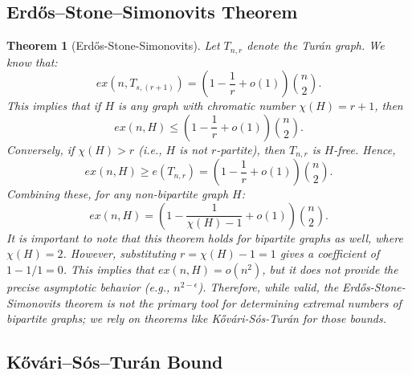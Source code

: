 \documentclass[a4paper]{article}
\newtheorem{thm}{Theorem}[section]
\begin{document}
\subsection{Erdős–Stone–Simonovits Theorem}

\begin{thm}[Erd\H{o}s-Stone-Simonovits]
    Let $T_{n,r}$ denote the Tur\'{a}n graph. We know that:
    \[
    ex(n, T_{s,(r+1)}) = \left (1-\frac{1}{r}+o(1)\right ){n \choose 2}.
    \] 
    This implies that if $H$ is any graph with chromatic number $\chi(H) = r+1$, then
    \[
    ex(n,H) \leq \left( 1-\frac{1}{r}+o(1) \right){n \choose 2}.
    \] 
    Conversely, if $\chi(H) > r$ (i.e., $H$ is not $r$-partite), then $T_{n,r}$ is $H$-free. Hence,
    \[
    ex(n,H) \geq e(T_{n,r}) = \left( 1-\frac{1}{r}+o(1) \right){n \choose 2}.
    \] 
    Combining these, for any non-bipartite graph $H$:
    \[
    ex(n,H) = \left( 1-\frac{1}{\chi(H)-1}+o(1) \right){n \choose 2}.
    \] 
    It is important to note that this theorem holds for bipartite graphs as well, where $\chi(H) = 2$. However, substituting $r = \chi(H) - 1 = 1$ gives a coefficient of $1 - 1/1 = 0$. This implies that $ex(n, H) = o(n^2)$, but it does not provide the precise asymptotic behavior (e.g., $n^{2-\epsilon}$). Therefore, while valid, the Erd\H{o}s-Stone-Simonovits theorem is not the primary tool for determining extremal numbers of bipartite graphs; we rely on theorems like K\H{o}v\'{a}ri-S\'{o}s-Tur\'{a}n for those bounds.
\end{thm}

\subsection{Kővári–Sós–Turán Bound}
\end{document}
